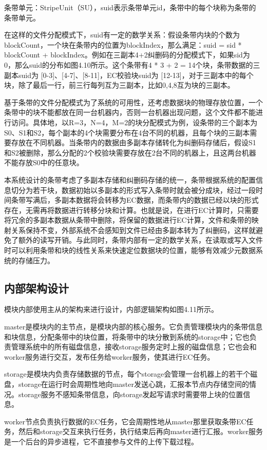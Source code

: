 条带单元：StripeUnit（SU），suid表示条带单元id，条带中的每个块称为条带的条带单元。

在这样的文件分配模式下，suid有一定的数学关系：假设条带内块的个数为blockCount，一个块在条带内的位置为blockIndex，那么满足：suid = sid * blockCount + blockIndex。例如在三副本4+2纠删码的分配模式下，如果sid为 0，那么suid的分布如图4.10所示。这个条带有4 * 3 + 2 = 14个块，条带数据的三副本suid为 [0-3]、[4-7]、[8-11]，EC校验块suid为 [12-13]，对于三副本中的每个块，除了最后一行，前三行每列互为三副本，比如0,4,8互为块的三副本。

基于条带的文件分配模式为了系统的可用性，还考虑数据块的物理存放位置，一个条带中的块不能都放在同一台机器内，否则一台机器出现问题，这个文件都不能进行访问。具体地，以R=3，N=4，M=2的块分配模式为例，设条带的三个副本为S0、S1和S2，每个副本的4个块需要分布在4台不同的机器，且每个块的三副本需要存放在不同机器。当条带内的数据由多副本存储转化为纠删码存储后，假设S1和S2被删除，那么分配的2个校验块需要存放在2台不同的机器上，且这两台机器不能存放S0中的任意块。

本系统设计的条带考虑了多副本存储和纠删码存储的统一，条带根据系统的配置信息切分为若干块，数据初始以多副本的形式写入条带时就会被分成块，经过一段时间条带写满后，多副本数据将会转移为EC数据，而条带内的数据已经以块的形式存在，无需再将数据进行转移分块和计算。也就是说，在进行EC计算时，只需要将冗余的多副本数据从条带中删除，将保留的数据进行EC计算，文件和条带的映射关系保持不变，外部系统不会感知到文件已经由多副本转为了纠删码，这样就避免了额外的读写开销。与此同时，条带内部有一定的数学关系，在读取或写入文件时可以利用条带和块的线性关系来快速定位数据块的位置，能够有效减少元数据系统的存储压力。

\subsection{内部架构设计}%
模块内部使用主从的架构来进行设计，内部逻辑架构如图4.11所示。

master是模块内的主节点，是模块内部的核心服务。它负责管理模块内的条带信息和块信息，分配条带中的块位置，将条带中的块分散到系统的storage中；它也负责管理系统中的所有磁盘信息，接收storage服务定时上报的磁盘信息；它也会和worker服务进行交互，发布任务给worker服务，使其进行EC任务。

storage是模块内负责存储数据的节点，每个storage会管理一台机器上的若干个磁盘，storage在运行时会周期性地向master发送心跳，汇报本节点内存储空间的情况。storage服务不感知条带信息，向storage发起写请求时需要带上块的位置信息。

worker节点负责执行数据的EC任务，它会周期性地从master那里获取条带EC任务，然后和storage交互来执行任务，执行结束后再向master进行汇报。worker服务是一个后台的异步进程，它不直接参与文件的上传下载过程。

